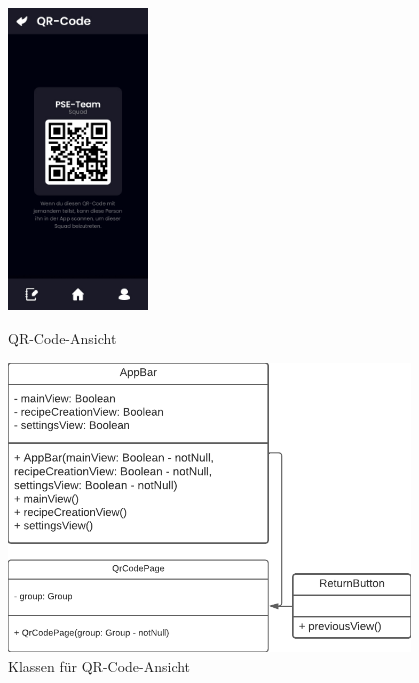 \documentclass{entwurfsheft}
\begin{document}
\begin{figure}[htp]
    \begin{minipage}
        [t]{0.49\textwidth}
        \centering
        \includegraphics[height=80mm]{images/Presentation-layer/QRCodeView.jpg}
        \caption{QR-Code-Ansicht}
    \end{minipage}
    \begin{minipage}
        [t]{0.49\textwidth}
        \centering
        \includegraphics[width=0.95\textwidth]{images/Presentation-layer/QRCodeViewClass.pdf}
        \caption{Klassen für QR-Code-Ansicht}
    \end{minipage}
\end{figure}
\newpage

\newpage
\end{document}
